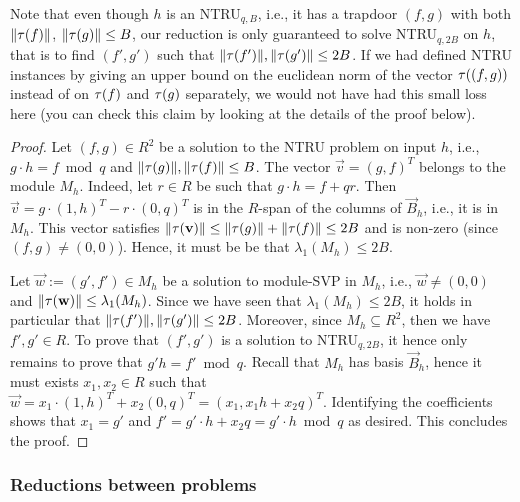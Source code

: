 Note that even though $h$ is an NTRU$_{q,B}$, i.e., it has a trapdoor $(f,g)$ with both $\|\tau(f)\|$, $\|\tau(g)\| \leq B$, our reduction is only guaranteed to solve NTRU$_{q,2B}$ on $h$, that is to find $(f',g')$ such that $\|\tau(f')\|, \|\tau(g')\| \leq 2B$. If we had defined NTRU instances by giving an upper bound on the euclidean norm of the vector $\tau((f,g))$ instead of  on $\tau(f)$ and $\tau(g)$ separately, we would not have had this small loss here (you can check this claim by looking at the details of the proof below).


\begin{proof}
Let $(f,g) \in R^2$ be a solution to the NTRU problem on input $h$, i.e., $g \cdot h = f \bmod q$ and $\|\tau(g)\|, \|\tau(f)\| \leq B$. The vector $\vec v = (g,f)^T$ belongs to the module $M_h$. Indeed, let $r \in R$ be such that $g \cdot h = f + qr$. Then $\vec v = g \cdot (1, h)^T - r \cdot (0, q)^T$ is in the $R$-span of the columns of $\vec B_h$, i.e., it is in $M_h$.
This vector satisfies $\|\tau(\mathbf v)\| \leq \|\tau(g)\| + \| \tau(f)\| \leq 2B$ and is non-zero (since $(f,g) \neq (0,0)$). Hence, it must be be that $\lambda_1(M_h) \leq 2B$.

Let $\vec w := (g',f') \in M_h$ be a solution to module-SVP in $M_h$, i.e., $\vec w \neq (0,0)$ and $\|\tau(\mathbf w) \| \leq \lambda_1(M_h)$. Since we have seen that $\lambda_1(M_h) \leq 2B$, it holds in particular that $\|\tau(f')\|, \|\tau(g')\| \leq 2B$. Moreover, since $M_h \subseteq R^2$, then we have $f', g' \in R$. To prove that $(f',g')$ is a solution to NTRU$_{q,2B}$, it hence only remains to prove that $g' h = f' \bmod q$. Recall that $M_h$ has basis $\vec B_h$, hence it must exists $x_1, x_2 \in R$ such that $\vec w = x_1 \cdot (1, h)^T + x_2 (0, q)^T = (x_1, x_1 h + x_2 q)^T$. Identifying the coefficients shows that $x_1 = g'$ and $f' = g' \cdot h + x_2 q = g' \cdot h \bmod q$ as desired. This concludes the proof.
\end{proof}



\subsubsection{Reductions between problems}

